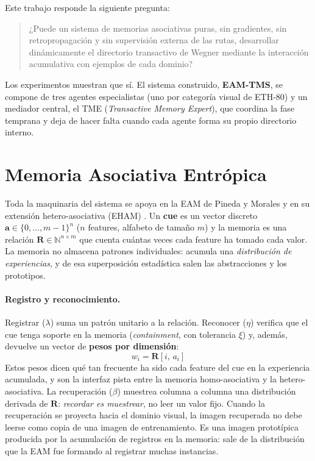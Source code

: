 \documentclass[11pt]{article}
\begin{document}
Este trabajo responde la siguiente pregunta:

\begin{quote}
¿Puede un sistema de memorias asociativas puras, sin gradientes, sin
retropropagación y sin supervisión externa de las rutas, desarrollar
dinámicamente el directorio transactivo de Wegner mediante la interacción
acumulativa con ejemplos de cada dominio?
\end{quote}

Los experimentos muestran que sí.
El sistema construido, \textbf{EAM-TMS}, se compone de tres agentes
especialistas (uno por categoría visual de ETH-80) y un mediador central, el
TME (\textit{Transactive Memory Expert}), que coordina la fase temprana y deja
de hacer falta cuando cada agente forma su propio directorio interno.

\section{Memoria Asociativa Entrópica}

Toda la maquinaria del sistema se apoya en la EAM de Pineda y Morales y en su
extensión hetero-asociativa (EHAM) \cite{pineda2021entropic,morales2024hetero}.
Un \textbf{cue} es un vector discreto $\mathbf{a} \in \{0,\ldots,m-1\}^n$
($n$ features, alfabeto de tamaño $m$) y la memoria es una relación
$\mathbf{R} \in \mathbb{N}^{n \times m}$ que cuenta cuántas veces cada feature
ha tomado cada valor.
La memoria no almacena patrones individuales: acumula una \emph{distribución de
experiencias}, y de esa superposición estadística salen las abstracciones y los
prototipos.

\paragraph{Registro y reconocimiento.}
Registrar ($\lambda$) suma un patrón unitario a la relación.
Reconocer ($\eta$) verifica que el cue tenga soporte en la memoria
(\emph{containment}, con tolerancia $\xi$) y, además, devuelve un vector de
\textbf{pesos por dimensión}:
\begin{equation}
    w_i = \mathbf{R}[i,\, a_i]
    \label{eq:pesos}
\end{equation}
Estos pesos dicen qué tan frecuente ha sido cada feature del cue en la
experiencia acumulada, y son la interfaz pista entre la memoria homo-asociativa
y la hetero-asociativa.
La recuperación ($\beta$) muestrea columna a columna una distribución derivada
de $\mathbf{R}$: \emph{recordar es muestrear}, no leer un valor fijo.
Cuando la recuperación se proyecta hacia el dominio visual, la imagen recuperada
no debe leerse como copia de una imagen de entrenamiento.
Es una imagen prototípica producida por la acumulación de registros en la memoria:
sale de la distribución que la EAM fue formando al registrar muchas instancias.
\end{document}
